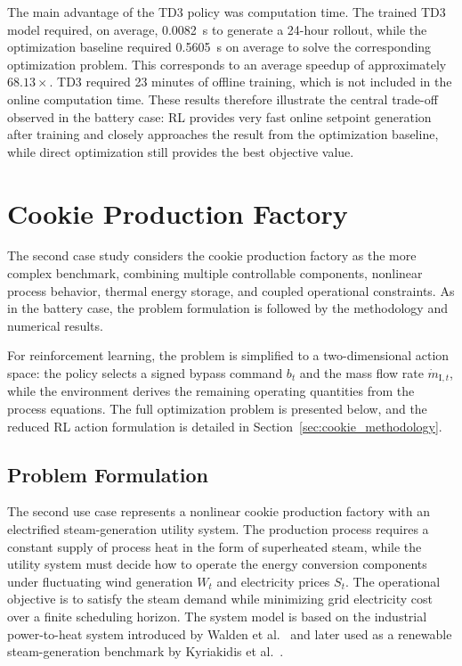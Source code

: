 \documentclass[12pt]{article}
\newcommand{\startnewpage}{\clearpage}
\begin{document}
The main advantage of the TD3 policy was computation time. The trained TD3 model required, on average, 0.0082~s to generate a 24-hour rollout, while the optimization baseline required 0.5605~s on average to solve the corresponding optimization problem. This corresponds to an average speedup of approximately $68.13\times$. TD3 required 23 minutes of offline training, which is not included in the online computation time. These results therefore illustrate the central trade-off observed in the battery case: RL provides very fast online setpoint generation after training and closely approaches the result from the optimization baseline, while direct optimization still provides the best objective value.

\startnewpage
\section{Cookie Production Factory}
\label{sec:cookie_case}

The second case study considers the cookie production factory as the more complex benchmark, combining multiple controllable components, nonlinear process behavior, thermal energy storage, and coupled operational constraints. As in the battery case, the problem formulation is followed by the methodology and numerical results.

For reinforcement learning, the problem is simplified to a two-dimensional action space: the policy selects a signed bypass command $b_t$ and the mass flow rate $\dot{m}_{\mathrm{I},t}$, while the environment derives the remaining operating quantities from the process equations. The full optimization problem is presented below, and the reduced RL action formulation is detailed in Section~\ref{sec:cookie_methodology}.

\subsection{Problem Formulation}
\label{sec:cookie_problem}

The second use case represents a nonlinear cookie production factory with an electrified steam-generation utility system. The production process requires a constant supply of process heat in the form of superheated steam, while the utility system must decide how to operate the energy conversion components under fluctuating wind generation $W_t$ and electricity prices $S_t$. The operational objective is to satisfy the steam demand while minimizing grid electricity cost over a finite scheduling horizon. The system model is based on the industrial power-to-heat system introduced by Walden et al.~\cite{walden2023nonlinear} and later used as a renewable steam-generation benchmark by Kyriakidis et al.~\cite{kyriakidis2024hybrid}.
\end{document}
